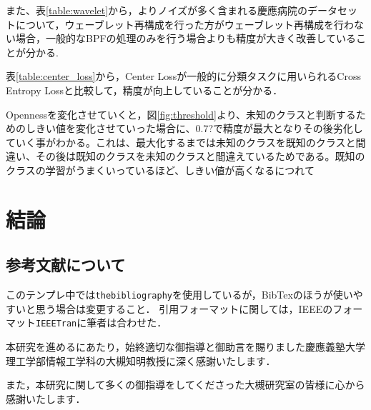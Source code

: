 また、表\ref{table:wavelet}から，よりノイズが多く含まれる慶應病院のデータセットについて，ウェーブレット再構成を行った方がウェーブレット再構成を行わない場合，一般的なBPFの処理のみを行う場合よりも精度が大きく改善していることが分かる.

表\ref{table:center_loss}から，Center Lossが一般的に分類タスクに用いられるCross Entropy Lossと比較して，精度が向上していることが分かる．

Opennessを変化させていくと，図\ref{fig:threshold}より、未知のクラスと判断するためのしきい値を変化させていった場合に、0.7?で精度が最大となりその後劣化していく事がわかる。これは、最大化するまでは未知のクラスを既知のクラスと間違い、その後は既知のクラスを未知のクラスと間違えているためである。既知のクラスの学習がうまくいっているほど、しきい値が高くなるにつれて

\chapter{結論}

\section{参考文献について}
このテンプレ中では{\tt thebibliography}を使用しているが，BibTexのほうが使いやすいと思う場合は変更すること．
引用フォーマットに関しては，IEEEのフォーマット{\tt IEEETran}に筆者は合わせた．

\begin{acknowledgment}

本研究を進めるにあたり，始終適切な御指導と御助言を賜りました慶應義塾大学理工学部情報工学科の大槻知明教授に深く感謝いたします．

また，本研究に関して多くの御指導をしてくださった大槻研究室の皆様に心から感謝いたします．


\end{acknowledgment}

